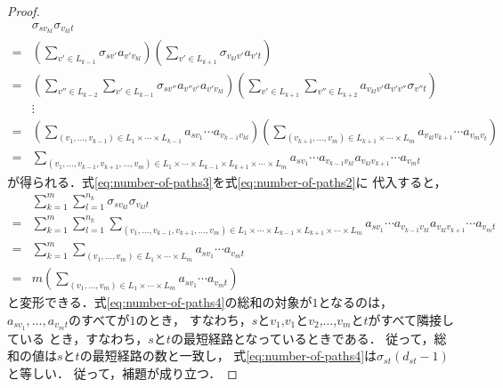 \begin{proof}
\begin{align}
    &\sigma_{sv_{kl}}\sigma_{v_{kl}t}\nonumber\\
    =&\left(\sum_{v'\in L_{k-1}}\sigma_{sv'}a_{v'v_{kl}}\right)
    \left(\sum_{v'\in L_{k+1}}\sigma_{v_{kl}v'}a_{v't}\right)
    \nonumber\\
    =&\left(\sum_{v''\in L_{k-2}}\sum_{v'\in L_{k-1}}
    \sigma_{sv''}a_{v''v'}a_{v'v_{kl}}\right)
    \left(\sum_{v'\in L_{k+1}}\sum_{v''\in L_{k+2}}
    a_{v_{kl}v'}a_{v'v''}\sigma_{v''t}\right)
    \nonumber\\
    &\vdots\nonumber\\
    =&\left(\sum_{(v_1,\ldots,v_{k-1})\in L_1\times\cdots\times L_{k-1}}
    a_{sv_1}\cdots a_{v_{k-1}v_{kl}}\right)
    \left(\sum_{(v_{k+1},\ldots,v_m)\in L_{k+1}\times\cdots\times L_m}
    a_{v_{kl}v_{k+1}}\cdots a_{v_mv_t}\right)\nonumber\\
    =&\sum_{(v_1,\ldots,v_{k-1},v_{k+1},\ldots,v_m)\in L_1\times\cdots\times L_{k-1}\times L_{k+1}\times\cdots\times L_m}
    a_{sv_1}\cdots a_{v_{k-1}v_{kl}}a_{v_{kl}v_{k+1}}\cdots a_{v_mt}
    \label{eq:number-of-paths3}
  \end{align}
  が得られる．式\eqref{eq:number-of-paths3}を式\eqref{eq:number-of-paths2}に
  代入すると，
  \begin{align}
    &\sum_{k=1}^m\sum_{l=1}^{n_k}\sigma_{sv_{kl}}\sigma_{v_{kl}t}\nonumber\\
    =&\sum_{k=1}^m\sum_{l=1}^{n_k}\sum_{
      (v_1,\ldots,v_{k-1},v_{k+1},\ldots,v_m)\in
      L_1\times\cdots\times L_{k-1}\times L_{k+1}\times\cdots\times L_m
    }a_{sv_1}\cdots a_{v_{k-1}v_{kl}}a_{v_{kl}v_{k+1}}\cdots a_{v_mt}\nonumber\\
    =&\sum_{k=1}^m\sum_{(v_1,\ldots,v_m)\in L_1\times\cdots\times L_m}
    a_{sv_1}\cdots a_{v_mt}\nonumber\\
    =&m\left(\sum_{(v_1,\ldots,v_m)\in L_1\times\cdots\times L_m}
    a_{sv_1}\cdots a_{v_mt}\right)
    \label{eq:number-of-paths4}
  \end{align}
  と変形できる．式\eqref{eq:number-of-paths4}の総和の対象が$1$となるのは，
  $a_{sv_1},\ldots,a_{v_mt}$のすべてが$1$のとき，
  すなわち，$s$と$v_1$,$v_1$と$v_2$,$\ldots$,$v_m$と$t$がすべて隣接している
  とき，すなわち，$s$と$t$の最短経路となっているときである．
  従って，総和の値は$s$と$t$の最短経路の数と一致し，
  式\eqref{eq:number-of-paths4}は$\sigma_{st}(d_{st}-1)$と等しい．
  従って，補題が成り立つ．
\end{proof}

